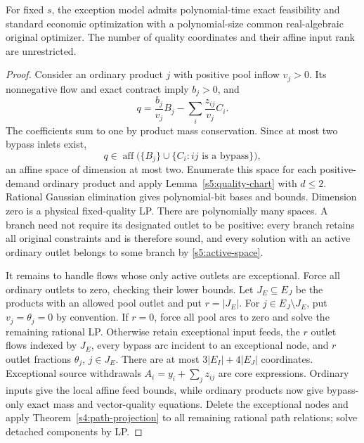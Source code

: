 \begin{theorem}
\label{s5:arbitrary-exceptions}
For fixed $s$, the exception model admits polynomial-time exact
feasibility and standard economic optimization with a polynomial-size
common real-algebraic original optimizer. The number of quality
coordinates and their affine input rank are unrestricted.
\end{theorem}
\begin{proof}
Consider an ordinary product $j$ with positive pool inflow $v_j>0$.
Its nonnegative flow and exact contract imply $b_j>0$, and
\[
 q=\frac{b_j}{v_j}B_j-\sum_i\frac{z_{ij}}{v_j}C_i.
\]
The coefficients sum to one by product mass conservation. Since at most
two bypass inlets exist,
\begin{equation}
 q\in\operatorname{aff}\bigl(\{B_j\}\cup
                    \{C_i:ij\text{ is a bypass}\}\bigr),
 \label{s5:active-space}
\end{equation}
an affine space of dimension at most two. Enumerate this space for each
positive-demand ordinary product and apply
Lemma~\ref{s5:quality-chart} with $d\le2$. Rational Gaussian elimination
gives polynomial-bit bases and bounds. Dimension zero is a physical
fixed-quality LP. There are polynomially many spaces. A branch need not
require its designated outlet to be positive: every
branch retains all original constraints and is therefore sound, and every solution
with an active ordinary outlet belongs to some branch by
\eqref{s5:active-space}.

It remains to handle flows whose only active outlets are exceptional.
Force all ordinary outlets to zero, checking their lower bounds.
Let $J_E\subseteq E_J$ be the products with an allowed pool outlet and
put $r=|J_E|$. For $j\in E_J\setminus J_E$, put $v_j=\theta_j=0$
by convention. If $r=0$, force all pool arcs to zero and solve the
remaining rational LP. Otherwise retain exceptional input feeds, the
$r$ outlet flows indexed by $J_E$, every bypass arc incident to an
exceptional node, and $r$ outlet fractions $\theta_j$, $j\in J_E$.
There are at most $3|E_I|+4|E_J|$ coordinates. Exceptional source
withdrawals $A_i=y_i+\sum_jz_{ij}$ are core expressions. Ordinary
inputs give the local affine feed bounds, while ordinary products now
give bypass-only exact mass and vector-quality equations. Delete the
exceptional nodes and apply Theorem~\ref{s4:path-projection} to all
remaining rational path relations; solve detached components by LP.


\end{proof}
